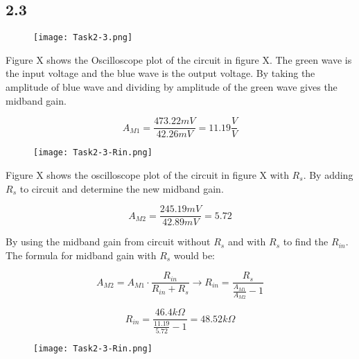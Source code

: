 \pagebreak
\subsection*{2.3}

    \begin{figure}[h!]
        \centering
        \texttt{[image: Task2-3.png]}
    \end{figure}

	Figure X shows the Oscilloscope plot of the circuit in figure X. The green wave is the input voltage and the blue wave is the output voltage. By taking the amplitude of blue wave and dividing by amplitude of the green wave gives the midband gain.

	$$ A_{M1} = \frac{473.22 mV}{42.26 mV} = 11.19 \frac{V}{V} $$

\pagebreak

    \begin{figure}[h!]
        \centering
        \texttt{[image: Task2-3-Rin.png]}
    \end{figure}

	Figure X shows the oscilloscope plot of the circuit in figure X with $R_{s}$. By adding $R_{s}$ to circuit and determine the new midband gain.

	$$ A_{M2} = \frac{245.19 mV}{42.89 mV} = 5.72 $$

	By using the midband gain from circuit without $R_{s}$ and with $R_{s}$ to find the $R_{in}$. The formula for midband gain with $R_{s}$ would be:  

	$$A_{M2} = A_{M1} \cdot \frac{R_{in}}{R_{in} + R_{s}} \rightarrow R_{in} = \frac{R_{s}}{\frac{A_{M1}}{A_{M2}}-1}  $$

	$$  R_{in} = \frac{46.4 k \Omega }{\frac{11.19}{5.72}-1} = 48.52 k \Omega$$ 

	\begin{figure}[h!]
        \centering
        \texttt{[image: Task2-3-Rin.png]}
    \end{figure}

